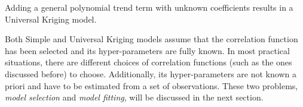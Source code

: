 Adding a general polynomial trend term with unknown coefficients results in a Universal Kriging model.


Both Simple and Universal Kriging models assume that the correlation function has been selected and its hyper-parameters are fully known.
In most practical situations, there are different choices of correlation functions (such as the ones discussed before) to choose.
Additionally, its hyper-parameters are not known a priori and have to be estimated from a set of observations.
These two problems, \emph{model selection} and \emph{model fitting}, will be discussed in the next section. 
